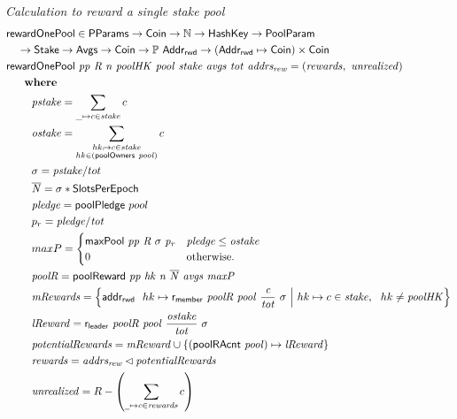 \begin{figure}[htb]
  \emph{Calculation to reward a single stake pool}
  \begin{align*}
      & \fun{rewardOnePool} \in \PParams \to \Coin \to \N \to \HashKey \to \PoolParam\\
      & ~~~\to \Stake \to \Avgs \to \Coin \to \powerset{\AddrRWD}
           \to (\AddrRWD \mapsto \Coin)\times\Coin \\
      & \rewardOnePool{pp}{R}{n}{poolHK}{pool}{stake}{avgs}{tot}{addrs_{rew}} =
          (\var{rewards},~\var{unrealized})\\
      & ~~~\where \\
      & ~~~~~~~\var{pstake} = \sum_{\_\mapsto c\in\var{stake}} c \\
      & ~~~~~~~\var{ostake} = \sum_{\substack{
        hk_\mapsto c\in\var{stake}\\
        hk\in(\fun{poolOwners}~\var{pool})\\
        }} c \\
      & ~~~~~~~\sigma = \var{pstake} / tot \\
      & ~~~~~~~\var{\overline{N}} = \sigma * \SlotsPerEpoch\\
      & ~~~~~~~\var{pledge} = \fun{poolPledge}~pool \\
      & ~~~~~~~p_{r} = \var{pledge} / \var{tot} \\
      & ~~~~~~~maxP =
      \begin{cases}
        \fun{maxPool}~\var{pp}~\var{R}~\sigma~\var{p_r}&
        \var{pledge} \leq \var{ostake}\\
        0 & \text{otherwise.}
      \end{cases} \\
      & ~~~~~~~\var{poolR} = \poolReward{pp}{hk}{n}{\overline{N}}{avgs}{maxP} \\
      & ~~~~~~~\var{mRewards} = \left\{
                                  \addrRw~hk\mapsto\mReward{poolR}{pool}{\frac{c}{tot}}{\sigma}
                                  ~\Big\vert~
                                  hk\mapsto c\in\var{stake},~~hk \neq\var{poolHK}
                               \right\}\\
      & ~~~~~~~\var{lReward} = \lReward{poolR}{pool}{\frac{\var{ostake}}{tot}}{\sigma} \\
      & ~~~~~~~\var{potentialRewards} =
                 \var{mReward} \cup
                 \{(\fun{poolRAcnt}~\var{pool})\mapsto\var{lReward}\} \\
      & ~~~~~~~\var{rewards} = \var{addrs_{rew}}\restrictdom{\var{potentialRewards}} \\
      & ~~~~~~~\var{unrealized} = R - \left(\sum_{\wcard\mapsto c\in\var{rewards}} c\right) \\
  \end{align*}


\end{figure}
